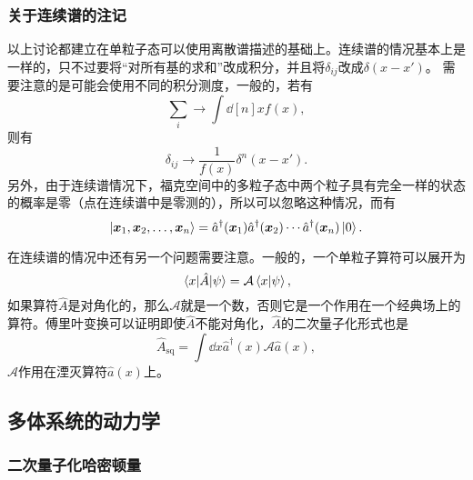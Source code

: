 \documentclass[UTF8, a4paper]{ctexart}
\begin{document}
\subsubsection{关于连续谱的注记}

以上讨论都建立在单粒子态可以使用离散谱描述的基础上。连续谱的情况基本上是一样的，只不过要将“对所有基的求和”改成积分，并且将$\delta_{ij}$改成$\delta(x - x')$。
需要注意的是可能会使用不同的积分测度，一般的，若有
\[
    \sum_i \longrightarrow \int \dd[n]{x} f(x),
\]
则有
\[
    \delta_{ij} \longrightarrow \frac{1}{f(x)} \delta^n(x - x').
\]
另外，由于连续谱情况下，福克空间中的多粒子态中两个粒子具有完全一样的状态的概率是零（点在连续谱中是零测的），所以可以忽略这种情况，而有
\begin{equation}
    \ket{\vb*{x}_1, \vb*{x}_2, \ldots, \vb*{x}_n} = \hat{a}^\dagger(\vb*{x}_1) \hat{a}^\dagger(\vb*{x}_2) \cdots \hat{a}^\dagger (\vb*{x}_n ) \ket{0}.
\end{equation}

在连续谱的情况中还有另一个问题需要注意。一般的，一个单粒子算符可以展开为
\[
    \mel{x}{\hat{A}}{\psi} = \mathcal{A} \braket{x}{\psi},
\]
如果算符$\hat{A}$是对角化的，那么$\mathcal{A}$就是一个数，否则它是一个作用在一个经典场上的算符。傅里叶变换可以证明即使$\hat{A}$不能对角化，$\hat{A}$的二次量子化形式也是
\[
    \hat{A}_\text{sq} = \int \dd{x} \hat{a}^\dagger (x) \mathcal{A} \hat{a}(x), 
\]
$\mathcal{A}$作用在湮灭算符$\hat{a}(x)$上。

\subsection{多体系统的动力学}\label{sec:many-body-dynamics}


\subsubsection{二次量子化哈密顿量}

\end{document}
